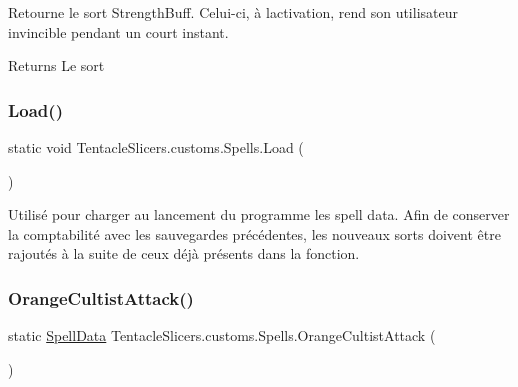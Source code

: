 Retourne le sort Strength\+Buff. Celui-\/ci, à l\textquotesingle{}activation, rend son utilisateur invincible pendant un court instant. 

\begin{DoxyReturn}{Returns}
Le sort 
\end{DoxyReturn}
\mbox{\label{class_tentacle_slicers_1_1customs_1_1_spells_aa6c96bd7d4dbfae6c4e007e5e1a6292c}} 
\subsubsection{\texorpdfstring{Load()}{Load()}}
{\footnotesize\ttfamily static void Tentacle\+Slicers.\+customs.\+Spells.\+Load (\begin{DoxyParamCaption}{ }\end{DoxyParamCaption})\hspace{0.3cm}{\ttfamily [static]}}



Utilisé pour charger au lancement du programme les spell data. Afin de conserver la comptabilité avec les sauvegardes précédentes, les nouveaux sorts doivent être rajoutés à la suite de ceux déjà présents dans la fonction. 

\mbox{\label{class_tentacle_slicers_1_1customs_1_1_spells_a2fd11f64a567bf4b829fafe59fdb2777}} 
\subsubsection{\texorpdfstring{Orange\+Cultist\+Attack()}{OrangeCultistAttack()}}
{\footnotesize\ttfamily static \hyperlink{class_tentacle_slicers_1_1spells_1_1_spell_data}{Spell\+Data} Tentacle\+Slicers.\+customs.\+Spells.\+Orange\+Cultist\+Attack (\begin{DoxyParamCaption}{ }\end{DoxyParamCaption})\hspace{0.3cm}{\ttfamily [static]}}




